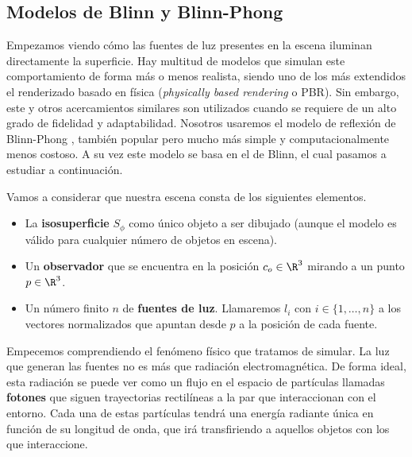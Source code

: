 \subsection{Modelos de Blinn y Blinn-Phong}
Empezamos viendo cómo las fuentes de luz presentes en la escena iluminan directamente la superficie. Hay multitud de modelos que simulan este comportamiento de forma más o menos realista, siendo uno de los más extendidos el renderizado basado en física (\textit{physically based rendering} o PBR). Sin embargo, este y otros acercamientos similares son utilizados cuando se requiere de un alto grado de fidelidad y adaptabilidad. Nosotros usaremos el modelo de reflexión de Blinn-Phong \cite{apuntes:ig}, también popular pero mucho más simple y computacionalmente menos costoso. A su vez este modelo se basa en el de Blinn, el cual pasamos a estudiar a continuación. \newline

Vamos a considerar que nuestra escena consta de los siguientes elementos.
\begin{itemize}
    \item La \textbf{isosuperficie} $S_{\phi}$ como único objeto a ser dibujado (aunque el modelo es válido para cualquier número de objetos en escena).
    \item Un \textbf{observador} que se encuentra en la posición $c_o\in\R^3$ mirando a un punto $p\in \R^3$.
    \item Un número finito $n$ de \textbf{fuentes de luz}. Llamaremos $l_i$ con $i\in \{1,\dots, n\}$ a los vectores normalizados que apuntan desde $p$ a la posición de cada fuente.
\end{itemize}

Empecemos comprendiendo el fenómeno físico que tratamos de simular. La luz que generan las fuentes no es más que radiación electromagnética. De forma ideal, esta radiación se puede ver como un flujo en el espacio de partículas llamadas \textbf{fotones} que siguen trayectorias rectilíneas a la par que interaccionan con el entorno. Cada una de estas partículas tendrá una energía radiante única en función de su longitud de onda, que irá transfiriendo a aquellos objetos con los que interaccione.

